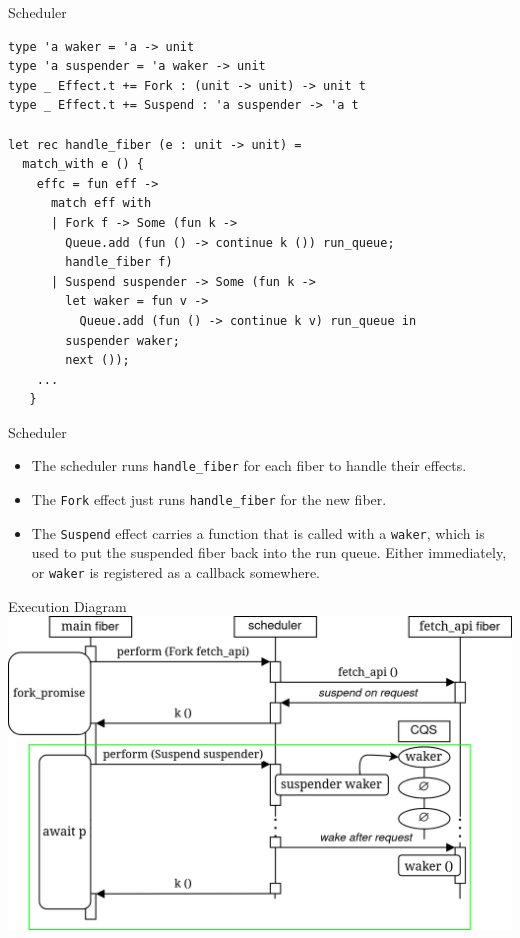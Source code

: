 \documentclass[aspectratio=43]{beamer}
\newcommand{\ocaml}[1]{\texttt{#1}}
\begin{document}
\begin{frame}[fragile]{Scheduler}
    \begin{verbatim}
type 'a waker = 'a -> unit
type 'a suspender = 'a waker -> unit
type _ Effect.t += Fork : (unit -> unit) -> unit t
type _ Effect.t += Suspend : 'a suspender -> 'a t

let rec handle_fiber (e : unit -> unit) =
  match_with e () {
    effc = fun eff ->
      match eff with
      | Fork f -> Some (fun k ->
        Queue.add (fun () -> continue k ()) run_queue;
        handle_fiber f)
      | Suspend suspender -> Some (fun k -> 
        let waker = fun v -> 
          Queue.add (fun () -> continue k v) run_queue in
        suspender waker;
        next ());
    ...
   }
    \end{verbatim}
\end{frame}

\begin{frame}{Scheduler}
    \begin{itemize}
        \item The scheduler runs \ocaml{handle_fiber} for each fiber to handle their effects.
        \item The \ocaml{Fork} effect just runs \ocaml{handle_fiber} for the new fiber.
        \item The \ocaml{Suspend} effect carries a function that is called with a \ocaml{waker}, which is used to put the suspended fiber back into the run queue. Either immediately, or \ocaml{waker} is registered as a callback somewhere.
    \end{itemize}
\end{frame}

\begin{frame}{Execution Diagram}
    \includegraphics[width=\textwidth]{sequence diagram.png}
\end{frame}
\end{document}

